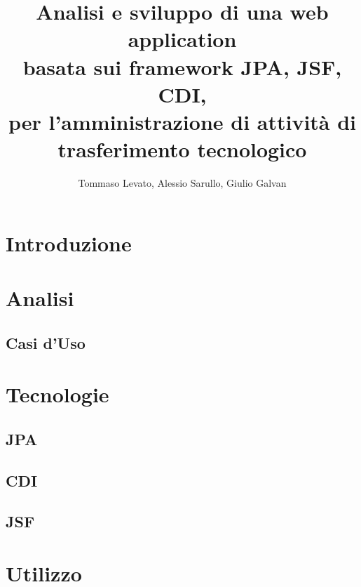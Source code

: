 \documentclass[a4paper,10pt]{report}
\title{Analisi e sviluppo di una web application \\
basata sui framework JPA, JSF, CDI, \\
per l'amministrazione di attività di trasferimento tecnologico}
\author{Tommaso Levato, Alessio Sarullo, Giulio Galvan}
\begin{document}
\maketitle


\begin{abstract}
\end{abstract}

\tableofcontents

\chapter{Introduzione}
\chapter{Analisi}
\section{Casi d'Uso}

\chapter{Tecnologie}
\section{JPA}
\section{CDI}
\section{JSF}
\chapter{Utilizzo}
\end{document}
